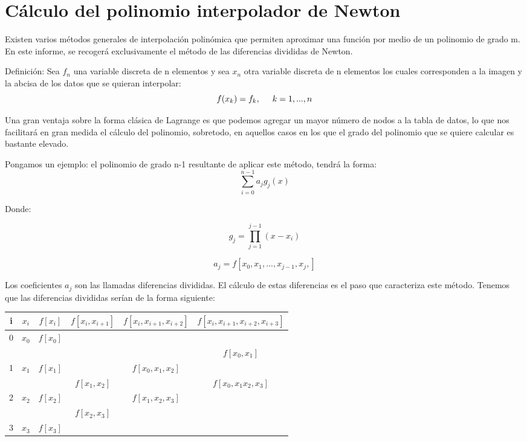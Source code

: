 \section{Cálculo del polinomio interpolador de Newton}
\label{2:sec:2}
  Existen varios métodos generales de interpolación polinómica que permiten aproximar una función por medio de un polinomio de grado m. En este informe, se recogerá exclusivamente el método de las diferencias divididas de Newton.\par Definición: Sea $f_{n}$  una variable discreta de n  elementos y sea $x_{n}$ otra variable discreta de n elementos los cuales corresponden a la imagen y la abcisa de los datos que se quieran interpolar:
  \[f(x_{k})=f_{k}, \hspace{0.5 cm} k=1,...,n\]\par
  Una gran ventaja sobre la forma clásica de Lagrange es que podemos agregar un mayor número de nodos a la tabla de datos, lo que nos facilitará en gran medida el cálculo del polinomio, sobretodo, en aquellos casos en los que el grado del polinomio que se quiere calcular es bastante elevado.\par Pongamos un ejemplo: el polinomio de grado n-1  resultante de aplicar este método, tendrá la forma:
  \[\sum_{i=0}^{n-1} {a_j}{g_j}(x)\]\par Donde:\par \[ g_{j}=\prod_{j=1}^{j-1}{(x-x_{i})}\]\par
  \[ a_{j}=f[x_{0},x_{1},...,x_{j-1},x_{j},]\]\par Los coeficientes $a_{j}$ son las llamadas diferencias divididas. El cálculo de estas diferencias es el paso que caracteriza este método. Tenemos que las diferencias divididas serían de la forma siguiente:\par\par
  
  
  \par
  \begin{tabular}{|c|c|c|c|c|c|}
     \hline
     i & $x_{i}$ & $f[x_{i}]$ & $f[x_{i},x_{i+1}]$ & $f[x_{i}, x_{i+1}, x_{i+2}]$ & $f[x_{i},x_{i+1}, x_{i+2}, x_{i+3}]$ \\
     \hline
     0 & $x_{0}$ & $f[x_{0}]$ & & &\\
       &         &            & & & $f[x_{0},x_{1}]$ \\
     1 & $x_{1}$ & $f[x_{1}]$ & & $f[x_{0},x_{1},x_{2}]$ & \\
       & & & $f[x_{1},x_{2}]$ & & $f[x_{0},x_{1}x_{2},x_{3}]$ \\
     2 & $x_{2}$ & $f[x_{2}]$ & & $f[x_{1},x_{2},x_{3}]$ & \\
       & & & $f[x_{2},x_{3}]$ & & \\
     3 & $x_{3}$ & $f[x_{3}]$ & & & \\
     \hline
  \end{tabular}